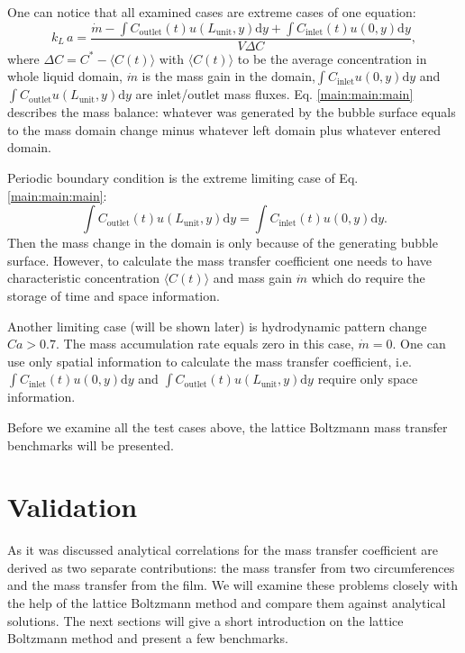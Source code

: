 \documentclass{article}
\newcommand{\beq}{\begin{equation}}
\newcommand{\feq}{\end{equation}}
\newcommand{\beqstar}{\begin{equation*}}
\newcommand{\feqstar}{\end{equation*}}
\newcommand{\vol}{k_L\,a}
\newcommand{\lunit}{L_{\mathrm{unit}}}
\newcommand{\cinlet}{C_{\mathrm{inlet}}}
\newcommand{\coutlet}{C_{\mathrm{outlet}}}
\newcommand{\cstar}{C^{*}}
\begin{document}
One can notice that all examined cases are extreme cases of one equation:
\beq
\label{main:main:main}
\vol=\frac{\dot{m}-\int{\coutlet(t) u(\lunit,y)\mathrm{d}y}+\int{\cinlet(t) u(0,y)\mathrm{d}y}}{V
\Delta C}, 
\feq
where $\Delta C=\cstar-\langle C(t) \rangle$ with $\langle C(t) \rangle$ to be the average
concentration in whole liquid domain, $\dot{m}$ is the mass gain in the domain,$\int{\cinlet u(0,y) \mathrm{d}y}$ and $\int{\coutlet u(\lunit,y)\mathrm{d}y}$ are inlet/outlet mass fluxes. Eq. \ref{main:main:main} describes the mass
balance: whatever was generated by the bubble surface equals to the mass domain change minus
whatever left domain plus whatever entered domain. 

Periodic boundary condition is the extreme
limiting case of Eq. \ref{main:main:main}: 
\beqstar
\int{\coutlet(t)
u(\lunit,y)\mathrm{d}y}=\int{\cinlet(t) u(0,y)\mathrm{d}y}. 
\feqstar
Then the mass change in the domain is
only because of the generating bubble surface. However, to calculate the mass transfer coefficient one needs to have characteristic concentration  $\langle C(t) \rangle$ and mass gain $\dot{m}$ which do require the storage of time and space information.

Another limiting case (will be shown later) is hydrodynamic pattern change $Ca>0.7$. The mass accumulation rate equals zero in this case, $\dot{m}=0$. One can use only spatial information to calculate the mass transfer coefficient, i.e. $\int{\cinlet(t) u(0,y)
\mathrm{d}y}$ and $\int{\coutlet(t) u(\lunit,y)\mathrm{d}y}$ require only space information. 

Before we examine all the test cases above, the lattice Boltzmann mass transfer
benchmarks will be presented. 

\section{Validation}
As it was discussed analytical correlations for the mass transfer coefficient are derived  as two separate contributions: the mass transfer from two circumferences and the mass transfer from the film. We will
examine
these problems closely with the help of the lattice Boltzmann method and compare them against analytical
solutions. The next sections will give a short introduction on the lattice Boltzmann method and present a few benchmarks.
\end{document}
